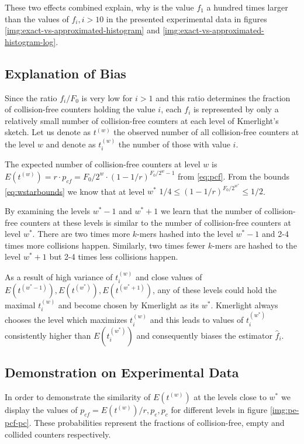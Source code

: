 These two effects combined explain, why is the value $f_1$ a hundred times larger than
the values of $f_i, i>10$ in the presented experimental data in figures
\ref{img:exact-vs-approximated-histogram} and \ref{img:exact-vs-approximated-histogram-log}.

\subsection{Explanation of Bias}
Since the ratio $f_i / F_0$ is very low for $i>1$ and this ratio determines
the fraction of collision-free counters holding the value $i$, each $f_i$ is
represented by only a relatively small number of collision-free counters at each level of 
Kmerlight's sketch. Let us denote as $t^{(w)}$ the observed number of all collision-free
counters at the level $w$ and denote as $t_i^{(w)}$ the number of those with value $i$.

The expected number of collision-free counters at level $w$ is 
$E(t^{(w)}) = r \cdot p_{cf} = F_0 / 2^w \cdot (1 - 1/r)^{F_0/2^w - 1}$ from \ref{eq:pcf}.
From the bounds \ref{eq:wstarbounds} we know that at level $w^*$
$1/4 \leq (1 - 1/r)^{F_0/2^{w^*}} \leq 1/2$.

By examining the levels $w^*-1$ and $w^*+1$ we learn that the number of collision-free counters at these levels is similar to the number of collision-free counters at level $w^*$. There are two times more $k$-mers hashed into the level $w^*-1$ and 2-4 times more collisions happen. Similarly, two times fewer $k$-mers are hashed to the level $w^*+1$ but 2-4 times less collisions happen.

As a result of high variance of $t_i^{(w)}$ and close values of $E(t^{(w^*-1)}), 
E(t^{(w^*)}),E(t^{(w^*+1)})$, any of these levels could hold the maximal $t_i^{(w)}$ 
and become chosen by Kmerlight as its $w^*$. Kmerlight always chooses the level which 
maximizes $t_i^{(w)}$ and this leads to values of $t_i^{(w^*)}$ consistently higher
than $E(t_i^{(w^*)})$ and consequently biases the estimator $\hat f_i$.

\subsection{Demonstration on Experimental Data}

In order to demonstrate the similarity of $E(t^{(w)})$ at the levels close to $w^*$ we
display the values of $p_{cf} = E(t^{(w)}) / r, p_e, p_c$ for different levels in
figure \ref{img:pe-pcf-pc}. These probabilities represent the fractions of 
collision-free, empty and collided counters respectively. 

